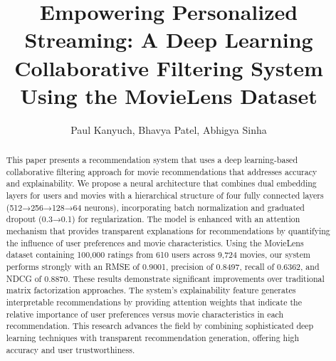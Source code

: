 \documentclass[sigconf]{acmart}
\begin{document}
\title{Empowering Personalized Streaming: A Deep Learning Collaborative Filtering System Using the MovieLens Dataset}

\author{Paul Kanyuch, Bhavya Patel, Abhigya Sinha}
  

\begin{abstract}
This paper presents a recommendation system that uses a deep learning-based collaborative filtering approach for movie recommendations that addresses accuracy and explainability. We propose a neural architecture that combines dual embedding layers for users and movies with a hierarchical structure of four fully connected layers (512→256→128→64 neurons), incorporating batch normalization and graduated dropout (0.3→0.1) for regularization. The model is enhanced with an attention mechanism that provides transparent explanations for recommendations by quantifying the influence of user preferences and movie characteristics. Using the MovieLens dataset containing 100,000 ratings from 610 users across 9,724 movies, our system performs strongly with an RMSE of 0.9001, precision of 0.8497, recall of 0.6362, and NDCG of 0.8870. These results demonstrate significant improvements over traditional matrix factorization approaches. The system's explainability feature generates interpretable recommendations by providing attention weights that indicate the relative importance of user preferences versus movie characteristics in each recommendation. This research advances the field by combining sophisticated deep learning techniques with transparent recommendation generation, offering high accuracy and user trustworthiness.
\end{abstract}


\maketitle

\end{document}
